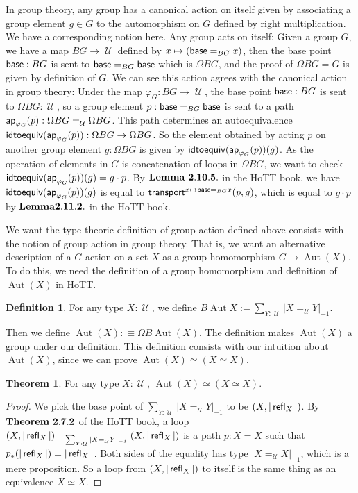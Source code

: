 \documentclass[11pt]{article}
\DeclareMathOperator{\cu}{\mathcal U}
\DeclareMathOperator{\Aut}{Aut}
\DeclareMathOperator{\base}{\sf base}
\DeclareMathOperator{\ap}{\sf ap}
\DeclareMathOperator{\transport}{\sf transport}
\DeclareMathOperator{\rfl}{\sf refl}
\DeclareMathOperator{\idtoequiv}{\sf idtoequiv}
\theoremstyle{definition}
\newtheorem{definition}{Definition}[section]
\newtheorem{theorem}{Theorem}[section]
\begin{document}
In group theory, any group has a canonical action on itself given by associating a group element $g\in G$ to the automorphism on $G$ defined by right multiplication. We have a corresponding notion here. Any group acts on itself: Given a group $G$, we have a map $BG\to \cu$ defined by $x\mapsto (\base =_{BG}x)$, then the base point $\base:BG$ is sent to $\base=_{BG}\base$ which is $\Omega BG$, and the proof of $\Omega BG= G$ is given by definition of $G$. We can see this action agrees with the canonical action in group theory: Under the map $\varphi_G:BG\to \cu$, the base point $\base :BG$ is sent to $\Omega BG:\cu$, so a group element $p:\base =_{BG}\base$ is sent to a path $\ap_{\varphi_{G}}(p):\Omega BG=_{\cu}\Omega BG$. This path determines an autoequivalence $\idtoequiv(\ap_{\varphi_G}(p)):\Omega BG \to \Omega BG$. So the element obtained by acting $p$ on another group element $g:\Omega BG$ is given by $\idtoequiv(\ap_{\varphi_G}(p))(g)$. As the operation of elements in $G$ is concatenation of loops in $\Omega BG$, we want to check $\idtoequiv(\ap_{\varphi_G}(p))(g) = g\cdot p$. By $\bf Lemma \ 2.10.5.$ in the HoTT book, we have $\idtoequiv(\ap_{\varphi_G}(p))(g)$ is equal to $\transport^{x\mapsto \base =_{BG} x}(p,g)$, which is equal to $g\cdot p$ by $\bf Lemma 2.11.2.$ in the HoTT book.


We want the type-theoric definition of group action defined above consists with the notion of group action in group theory. That is, we want an alternative description of a $G$-action on a set $X$ as a group homomorphism $G\to \Aut(X)$. To do this, we need the definition of a group homomorphism and definition of $\Aut (X)$ in HoTT.

\begin{definition}
    For any type $X:\cu$, we define $B\Aut X:= \sum_{Y:\cu}|X=_{\cu} Y|_{-1}$.
\end{definition}

Then we define $\Aut(X):\equiv \Omega B\Aut (X)$. The definition makes $\Aut(X)$ a group under our definition. This definition consists with our intuition about $\Aut (X)$, since we can prove $\Aut (X)\simeq (X\simeq X)$.

\begin{theorem}
    For any type $X:\cu$, $\Aut (X)\simeq (X\simeq X)$.
\end{theorem}
\begin{proof}
    We pick the base point of $\sum_{Y:\cu}|X=_{\cu}Y|_{-1}$ to be $(X,|\rfl_X|)$. By $\bf Theorem \ 2.7.2$ of the HoTT book, a loop $(X,|\rfl_X|)=_{\sum_{Y:\cu}|X=_{\cu}Y|_{-1}}(X,|\rfl_X|)$ is a path $p:X=X$ such that $p_*(|\rfl_X|)=|\rfl_X|$. Both sides of the equality has type $|X=_{\cu}X|_{-1}$, which is a mere proposition. So a loop from $(X,|\rfl_X|)$ to itself is the same thing as an equivalence $X\simeq X$.
\end{proof}
\end{document}
